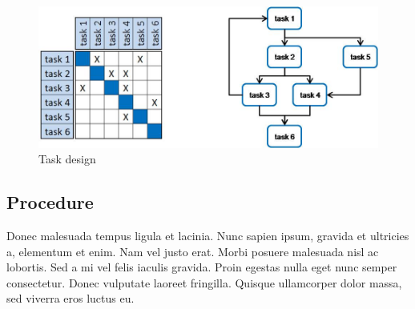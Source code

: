 \begin{figure}[!ht]
\centering
\includegraphics[scale = 0.90]{images/design} %
\caption{Task design}
\end{figure}

\subsection*{Procedure}
Donec malesuada tempus ligula et lacinia. Nunc sapien ipsum, gravida et ultricies a, elementum et enim. Nam vel justo erat. Morbi posuere malesuada nisl ac lobortis. Sed a mi vel felis iaculis gravida. Proin egestas nulla eget nunc semper consectetur. Donec vulputate laoreet fringilla. Quisque ullamcorper dolor massa, sed viverra eros luctus eu.
